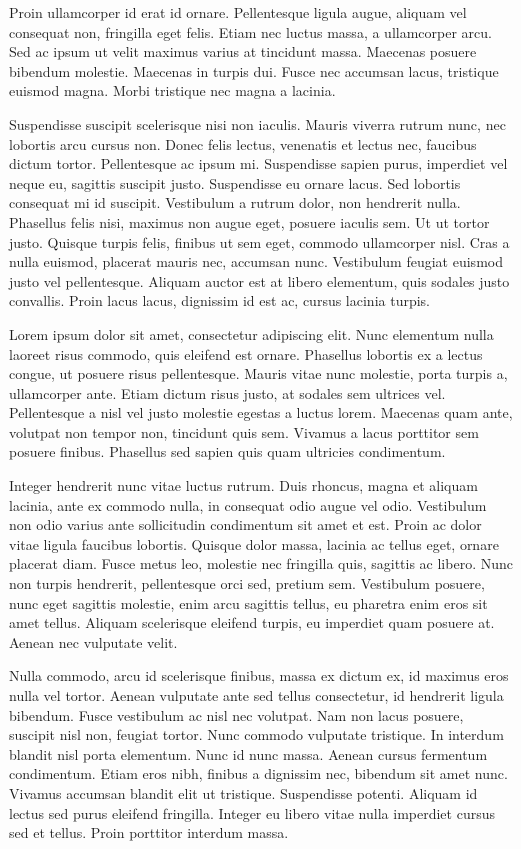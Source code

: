 \documentclass[twoside,openright,a4paper,11pt,french]{article}
\begin{document}
Proin ullamcorper id erat id ornare. Pellentesque ligula augue, aliquam vel consequat non, fringilla eget felis. Etiam nec luctus massa, a ullamcorper arcu. Sed ac ipsum ut velit maximus varius at tincidunt massa. Maecenas posuere bibendum molestie. Maecenas in turpis dui. Fusce nec accumsan lacus, tristique euismod magna. Morbi tristique nec magna a lacinia.

Suspendisse suscipit scelerisque nisi non iaculis. Mauris viverra rutrum nunc, nec lobortis arcu cursus non. Donec felis lectus, venenatis et lectus nec, faucibus dictum tortor. Pellentesque ac ipsum mi. Suspendisse sapien purus, imperdiet vel neque eu, sagittis suscipit justo. Suspendisse eu ornare lacus. Sed lobortis consequat mi id suscipit. Vestibulum a rutrum dolor, non hendrerit nulla. Phasellus felis nisi, maximus non augue eget, posuere iaculis sem. Ut ut tortor justo. Quisque turpis felis, finibus ut sem eget, commodo ullamcorper nisl. Cras a nulla euismod, placerat mauris nec, accumsan nunc. Vestibulum feugiat euismod justo vel pellentesque. Aliquam auctor est at libero elementum, quis sodales justo convallis. Proin lacus lacus, dignissim id est ac, cursus lacinia turpis.

Lorem ipsum dolor sit amet, consectetur adipiscing elit. Nunc elementum nulla laoreet risus commodo, quis eleifend est ornare. Phasellus lobortis ex a lectus congue, ut posuere risus pellentesque. Mauris vitae nunc molestie, porta turpis a, ullamcorper ante. Etiam dictum risus justo, at sodales sem ultrices vel. Pellentesque a nisl vel justo molestie egestas a luctus lorem. Maecenas quam ante, volutpat non tempor non, tincidunt quis sem. Vivamus a lacus porttitor sem posuere finibus. Phasellus sed sapien quis quam ultricies condimentum.

Integer hendrerit nunc vitae luctus rutrum. Duis rhoncus, magna et aliquam lacinia, ante ex commodo nulla, in consequat odio augue vel odio. Vestibulum non odio varius ante sollicitudin condimentum sit amet et est. Proin ac dolor vitae ligula faucibus lobortis. Quisque dolor massa, lacinia ac tellus eget, ornare placerat diam. Fusce metus leo, molestie nec fringilla quis, sagittis ac libero. Nunc non turpis hendrerit, pellentesque orci sed, pretium sem. Vestibulum posuere, nunc eget sagittis molestie, enim arcu sagittis tellus, eu pharetra enim eros sit amet tellus. Aliquam scelerisque eleifend turpis, eu imperdiet quam posuere at. Aenean nec vulputate velit.

Nulla commodo, arcu id scelerisque finibus, massa ex dictum ex, id maximus eros nulla vel tortor. Aenean vulputate ante sed tellus consectetur, id hendrerit ligula bibendum. Fusce vestibulum ac nisl nec volutpat. Nam non lacus posuere, suscipit nisl non, feugiat tortor. Nunc commodo vulputate tristique. In interdum blandit nisl porta elementum. Nunc id nunc massa. Aenean cursus fermentum condimentum. Etiam eros nibh, finibus a dignissim nec, bibendum sit amet nunc. Vivamus accumsan blandit elit ut tristique. Suspendisse potenti. Aliquam id lectus sed purus eleifend fringilla. Integer eu libero vitae nulla imperdiet cursus sed et tellus. Proin porttitor interdum massa.
\end{document}
